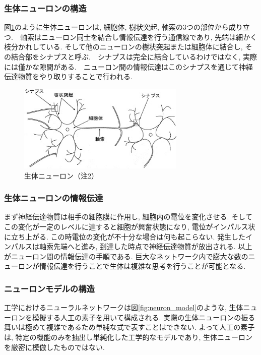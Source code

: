 \subsubsection{生体ニューロンの構造}

図\ref{fig:neuron}のように生体ニューロンは, 細胞体, 樹状突起, 軸索の3つの部位から成り立つ.　軸索はニューロン同士を結合し情報伝達を行う通信線であり, 先端は細かく枝分かれしている. そして他のニューロンの樹状突起または細胞体に結合し, その結合部をシナプスと呼ぶ.　シナプスは完全に結合しているわけではなく, 実際には僅かな隙間がある.　ニューロン間の情報伝達はこのシナプスを通じて神経伝達物質をやり取りすることで行われる.\\

\begin{figure}[htbp]
  \begin{center}
    \includegraphics[clip,width=8.0cm]{./images/Neuron.png}
    \caption{生体ニューロン（注2）}
    \label{fig:neuron}
  \end{center}
\end{figure}

\subsubsection{生体ニューロンの情報伝達}

まず神経伝達物質は相手の細胞膜に作用し, 細胞内の電位を変化させる. そしてこの変化が一定のレベルに達すると細胞が興奮状態になり, 電位がインパルス状に立ち上がる. この時電位の変化が不十分な場合は何も起こらない. 発生したインパルスは軸索先端へと進み, 到達した時点で神経伝達物質が放出される. 以上がニューロン間の情報伝達の手順である. 巨大なネットワーク内で膨大な数のニューロンが情報伝達を行うことで生体は複雑な思考を行うことが可能となる.

\subsubsection{ニューロンモデルの構造}

工学におけるニューラルネットワークは図\ref{fig:neuron_model}のような, 生体ニューロンを模擬する人工の素子を用いて構成される.
実際の生体ニューロンの振る舞いは極めて複雑であるため単純な式で表すことはできない. よって人工の素子は, 特定の機能のみを抽出し単純化した工学的なモデルであり, 生体ニューロンを厳密に模倣したものではない.

